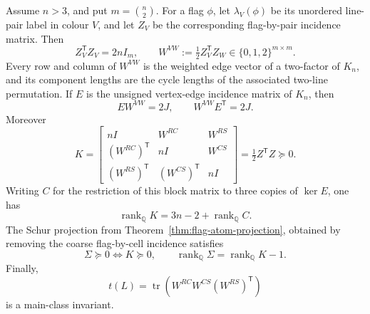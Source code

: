 \begin{theorem}
\label{thm:labelled-pair-gram}
Assume $n>3$, and put $m=\binom n2$.  For a flag $\phi$, let $\lambda_V(\phi)$ be its
unordered line-pair label in colour $V$, and let $Z_V$ be the corresponding
flag-by-pair incidence matrix.  Then
\[
 Z_V^{\mathsf T}Z_V=2nI_m,
 \qquad W^{VW}:=\tfrac12 Z_V^{\mathsf T}Z_W\in\{0,1,2\}^{m\times m}.
\]
Every row and column of $W^{VW}$ is the weighted edge vector of a two-factor
of $K_n$, and its component lengths are the cycle lengths of the associated
two-line permutation.  If $E$ is the unsigned vertex-edge incidence matrix
of $K_n$, then
\[
 EW^{VW}=2J,\qquad W^{VW}E^{\mathsf T}=2J.
\]
Moreover
\[
 K=\begin{bmatrix}
 nI&W^{RC}&W^{RS}\\
 (W^{RC})^{\mathsf T}&nI&W^{CS}\\
 (W^{RS})^{\mathsf T}&(W^{CS})^{\mathsf T}&nI
 \end{bmatrix}=\tfrac12 Z^{\mathsf T}Z\succeq0.
\]
Writing $C$ for the restriction of this block matrix to three copies of
$\ker E$, one has
\[
 \operatorname{rank}_{\mathbb Q}K=3n-2+
 \operatorname{rank}_{\mathbb Q}C.
\]
The Schur projection from Theorem~\ref{thm:flag-atom-projection}, obtained by
removing the coarse flag-by-cell
incidence satisfies
\[
 \Sigma\succeq0\Longleftrightarrow K\succeq0,
 \qquad \operatorname{rank}_{\mathbb Q}\Sigma=
 \operatorname{rank}_{\mathbb Q}K-1.
\]
Finally,
\[
 t(L)=\operatorname{tr}\!\left(
 W^{RC}W^{CS}(W^{RS})^{\mathsf T}\right)
\]
is a main-class invariant.
\end{theorem}

